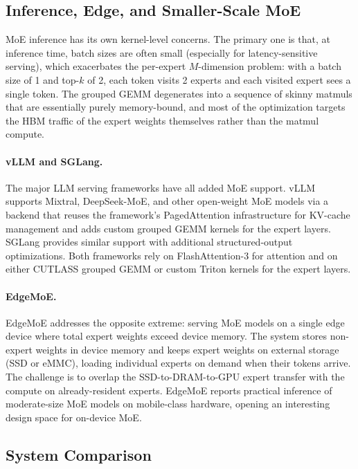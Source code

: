 \documentclass[10pt]{article}
\begin{document}
\subsection{Inference, Edge, and Smaller-Scale MoE}
\label{sec:moe-inference}

MoE inference has its own kernel-level concerns. The primary one is that, at inference time, batch sizes are often small (especially for latency-sensitive serving), which exacerbates the per-expert $M$-dimension problem: with a batch size of 1 and top-$k$ of 2, each token visits 2 experts and each visited expert sees a single token. The grouped GEMM degenerates into a sequence of skinny matmuls that are essentially purely memory-bound, and most of the optimization targets the HBM traffic of the expert weights themselves rather than the matmul compute.

\paragraph{vLLM and SGLang.}
The major LLM serving frameworks have all added MoE support. vLLM \citep{kwon2023vllm} supports Mixtral, DeepSeek-MoE, and other open-weight MoE models via a backend that reuses the framework's PagedAttention infrastructure for KV-cache management and adds custom grouped GEMM kernels for the expert layers. SGLang \citep{zheng2024sglang} provides similar support with additional structured-output optimizations. Both frameworks rely on FlashAttention-3 for attention and on either CUTLASS grouped GEMM or custom Triton kernels for the expert layers.

\paragraph{EdgeMoE.}
EdgeMoE \citep{yi2023edgemoe} addresses the opposite extreme: serving MoE models on a single edge device where total expert weights exceed device memory. The system stores non-expert weights in device memory and keeps expert weights on external storage (SSD or eMMC), loading individual experts on demand when their tokens arrive. The challenge is to overlap the SSD-to-DRAM-to-GPU expert transfer with the compute on already-resident experts. EdgeMoE reports practical inference of moderate-size MoE models on mobile-class hardware, opening an interesting design space for on-device MoE.

\subsection{System Comparison}
\label{sec:moe-comparison}
\end{document}
